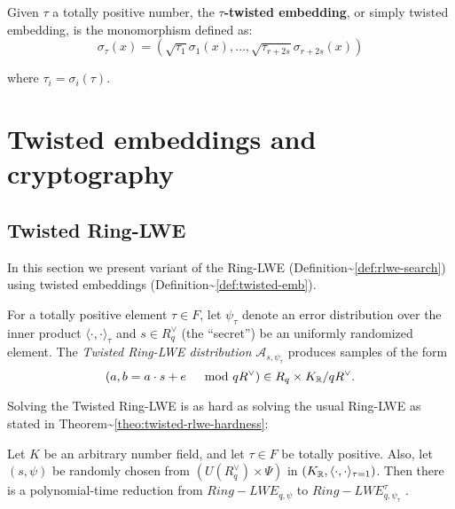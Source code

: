\documentclass[a4paper,12pt]{article}
\begin{document}
\begin{definition}
  \label{def:twisted-emb}
  Given $\tau$ a totally positive number, the \textbf{$\tau$-twisted embedding}, or
  simply twisted embedding, is the monomorphism defined as:
  \begin{equation*}
    \sigma_\tau(x) = \left( \sqrt{\tau_1}\sigma_1(x), \dots, \sqrt{\tau_{r+2s}}\sigma_{r+2s}(x) \right)
  \end{equation*}

  where $\tau_i = \sigma_i(\tau)$.
\end{definition}
\section{Twisted embeddings and cryptography}
\label{sec:orgfb95940}
\subsection{Twisted Ring-LWE}
\label{sec:org4d3b77e}
In this section we present variant of the Ring-LWE (Definition\textasciitilde{}\ref{def:rlwe-search}) using twisted embeddings (Definition\textasciitilde{}\ref{def:twisted-emb}).



\begin{definition}
  \label{def:twisted-ring-lwe}
  For a totally positive element $\tau \in F$, let $\psi_\tau$ denote an error distribution
  over the inner product $\langle{\cdot,\cdot}\rangle_\tau$ and $s \in R^\vee_q$ (the “secret”) be an
  uniformly randomized element. The \emph{Twisted Ring-LWE distribution}
  $\mathcal{A}_{s,\psi_\tau}$ produces samples of the form
  $$
  (a, b = a \cdot s + e \;\;\; \mod{qR^\vee}) \in R_q \times K_{\mathbb{R}}/qR^\vee.
  $$
\end{definition}

Solving the Twisted Ring-LWE is as hard as solving the usual Ring-LWE as stated in Theorem\textasciitilde{}\ref{theo:twisted-rlwe-hardness}:

\begin{theorem}
  \label{theo:twisted-rlwe-hardness}
  Let $K$ be an arbitrary number field, and let $\tau \in F$ be totally positive.
  Also, let $(s,\psi)$ be randomly chosen from $(U(R_q^\vee)\times \Psi)$ in $(K_{\mathbb{R}},\langle{\cdot,\cdot}\rangle_{\tau=1})$.
  Then there is a polynomial-time reduction from $Ring-LWE_{q,\psi}$ to $Ring-LWE^\tau_{q,\psi_\tau}$ .
\end{theorem}
\end{document}
